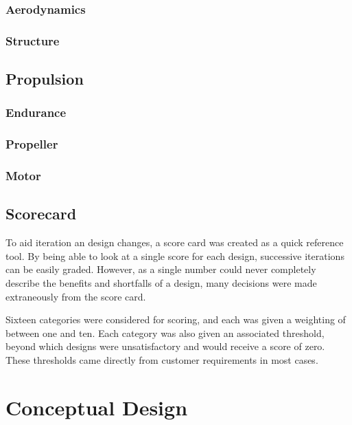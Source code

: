 \documentclass[letterpaper,12pt]{article}
\begin{document}
\subsubsection{Aerodynamics}  %


\subsubsection{Structure} %

\subsection{Propulsion}\label{sec:studies:prop} %

\subsubsection{Endurance}\label{sec:studies:prop:end} %

\subsubsection{Propeller}\label{sec:studies:prop:prop} %

\subsubsection{Motor}\label{sec:studies:prop:motor} %

\subsection{Scorecard}

To aid iteration an design changes, a score card was created as a quick reference tool. By being able to look at a single score for each design, successive iterations can be easily graded. However, as a single number could never completely describe the benefits and shortfalls of a design, many decisions were made extraneously from the score card. 

Sixteen categories were considered for scoring, and each was given a weighting of between one and ten. Each category was also given an associated threshold, beyond which designs were unsatisfactory and would receive a score of zero. These thresholds came directly from customer requirements in most cases. 

\section{Conceptual Design}\label{sec:design}
\end{document}
